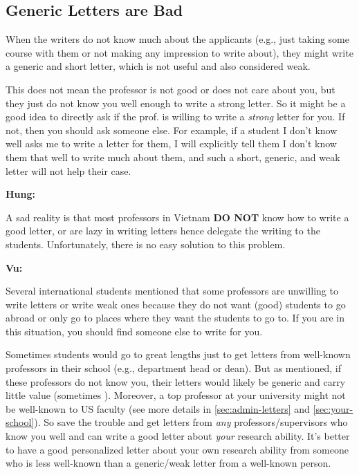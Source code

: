 \documentclass[oneside,11pt,dvipsnames]{book}
\newenvironment{commentbox}[1][]{
  \small
  \begin{mybox}
    {\small \textbf{#1}}
  }{
  \end{mybox}
}
\newcommand{\red}[1]{{\color{red}{#1}}}
\begin{document}
\subsection{Generic Letters are Bad}\label{sec:generic-letters} 
When the writers do not know much about the applicants (e.g., just taking some course with them or not making any impression to write about), they might write a generic and short letter, which is not useful and also considered weak. 

This does not mean the professor is not good or does not care about you, but they just do not know you well enough to write a strong letter.
So it might be a good idea to directly ask if the prof. is willing to write a \emph{strong} letter for you. If not, then you should ask someone else.  For example, if a student I don't know well asks me to write a letter for them, I will explicitly tell them I don't know them that well to write much about them, and such a short, generic, and weak letter will not help their case.


\begin{commentbox}[Hung:]
  A sad reality is that most professors in Vietnam \textbf{DO NOT} know how to write a good letter, or are lazy in writing letters hence delegate the writing to the students. Unfortunately, there is no easy solution to this problem.
\end{commentbox}

\begin{commentbox}[Vu:]

  Several international students mentioned that some professors are unwilling to write letters or write weak ones because they do not want (good) students to go abroad or only go to places where they want the students to go to. If you are in this situation, you should find someone else to write for you.
  \tcblower

Sometimes students would go to great lengths just to get letters from well-known professors in their school (e.g., department head or dean). But as mentioned, if these professors do not know you, their letters would likely be generic and carry little value (sometimes \red{red flags}). Moreover, a top professor at your university might not be well-known to US faculty (see more details in \autoref{sec:admin-letters} and \autoref{sec:your-school}). So save the trouble and get letters from \emph{any} professors/supervisors who know you well and can write a good letter about \emph{your} research ability. It's better to have a good personalized letter about your own research ability from someone who is less well-known than a generic/weak letter from a well-known person.

\end{commentbox}
\end{document}
